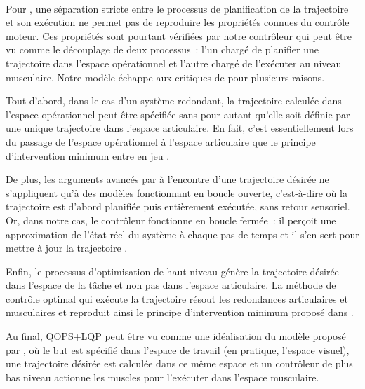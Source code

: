 \documentclass[pdftex,a4paper,11pt]{article}
\begin{document}

\paragraph{}

Pour \cite{todorov02_NN}, une séparation stricte entre le processus de planification de la
trajectoire et son exécution ne permet pas de reproduire les propriétés
connues du contrôle moteur.
Ces propriétés sont pourtant vérifiées par notre contrôleur qui peut être vu
comme le découplage de deux processus~:
l'un chargé de planifier une trajectoire dans l'espace opérationnel et l'autre
chargé de l'exécuter au niveau musculaire.
Notre modèle échappe aux critiques de \cite{todorov02_NN} pour plusieurs raisons.

Tout d'abord, dans le cas d'un système redondant, la trajectoire calculée dans l'espace
opérationnel peut être spécifiée sans pour autant qu'elle soit définie par une unique trajectoire
dans l'espace articulaire. En fait, c'est essentiellement lors du passage de
l'espace opérationnel à l'espace articulaire que le principe d'intervention
minimum entre en jeu \cite{todorov02_NN,todorov03_NIPS}.

De plus, les arguments avancés par \cite{todorov02_NN} à l'encontre d'une \og{}trajectoire désirée\fg{}
ne s'appliquent qu'à des modèles fonctionnant en boucle ouverte, c'est-à-dire
où la trajectoire est d'abord planifiée puis entièrement exécutée, sans retour sensoriel.
Or, dans notre cas, le contrôleur fonctionne en boucle fermée~: il perçoit une approximation
de l'état réel du système à chaque pas de temps et il s'en sert pour mettre à jour 
la trajectoire \cite{guigon08b}.

Enfin, le processus d'optimisation de haut niveau génère la \og{}trajectoire
désirée\fg{} dans l'espace de la tâche et non pas dans l'espace articulaire.
La méthode de contrôle optimal qui exécute la trajectoire %
résout les redondances articulaires et musculaires et reproduit ainsi le principe
d'intervention minimum proposé dans \cite{todorov02_NN,todorov03_NIPS}.

Au final, QOPS+LQP peut être vu comme une idéalisation du modèle proposé par \cite{shadmehr05},
où le but est spécifié dans l'espace de travail (en pratique, l'espace visuel),
une trajectoire désirée est calculée dans ce même espace
et un contrôleur de plus bas niveau actionne les muscles pour l'exécuter
dans l'espace musculaire.
\end{document}
